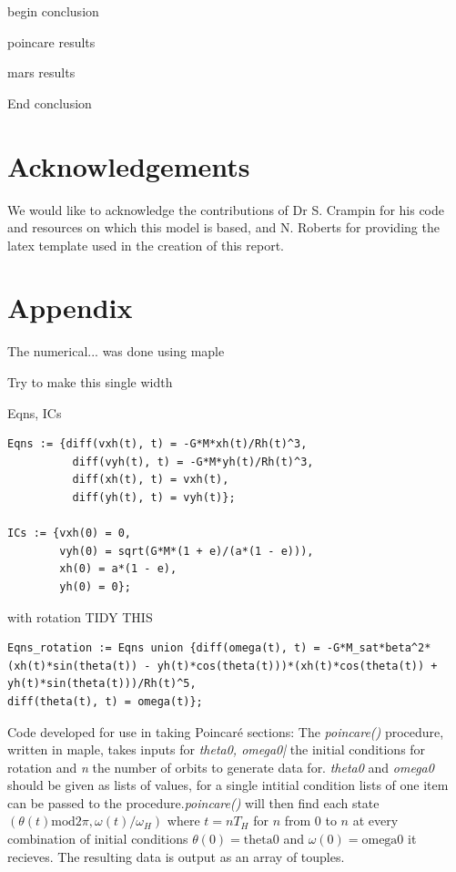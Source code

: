 \documentclass[10pt, twocolumn]{article} %
\begin{document}
begin conclusion

poincare results

mars results

End conclusion

\section*{Acknowledgements}
We would like to acknowledge the contributions of Dr S. Crampin for his code and resources on which this model is based, and N. Roberts for providing the latex template used in the creation of this report.




\clearpage

\section*{Appendix}
The numerical... was done using maple

Try to make this single width

Eqns, ICs
\begin{lstlisting}
Eqns := {diff(vxh(t), t) = -G*M*xh(t)/Rh(t)^3,
          diff(vyh(t), t) = -G*M*yh(t)/Rh(t)^3,
          diff(xh(t), t) = vxh(t),
          diff(yh(t), t) = vyh(t)};

ICs := {vxh(0) = 0,
        vyh(0) = sqrt(G*M*(1 + e)/(a*(1 - e))),
        xh(0) = a*(1 - e),
        yh(0) = 0};
\end{lstlisting}

with rotation TIDY THIS
\begin{lstlisting}
Eqns_rotation := Eqns union {diff(omega(t), t) = -G*M_sat*beta^2*(xh(t)*sin(theta(t)) - yh(t)*cos(theta(t)))*(xh(t)*cos(theta(t)) + yh(t)*sin(theta(t)))/Rh(t)^5,
diff(theta(t), t) = omega(t)};
\end{lstlisting}

Code developed for use in taking Poincar\'e sections: The \textit{poincare()} procedure, written in maple, takes inputs for \textit{theta0, omega0|} the initial conditions for rotation and \textit{n} the number of orbits to generate data for. \textit{theta0} and \textit{omega0} should be given as lists of values, for a single intitial condition lists of one item can be passed to the procedure.\textit{poincare()} will then find each state $(\theta(t) \text{mod} 2\pi, \omega(t)/\omega_H)$ where $t = nT_H$ for $n$ from 0 to $n$ at every combination of initial conditions $\theta(0) = \text{theta0}$ and $\omega(0) = \text{omega0}$ it recieves. The resulting data is output as an array of touples.
\end{document}
